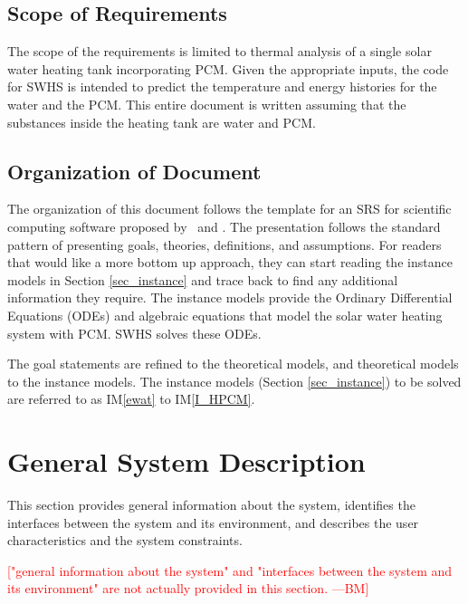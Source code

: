 \documentclass[12pt]{article}
\newcommand{\authornote}[3]{\textcolor{#1}{[#3 ---#2]}}
\newcommand{\authornote}[3]{}
\newcommand{\bmac}[1]{\authornote{red}{BM}{#1}}
\newcommand{\iref}[1]{IM\ref{#1}}
\newcommand{\progname}{SWHS}
\begin{document}
\subsection{Scope of Requirements} 

The scope of the requirements is limited to thermal analysis of a single solar
water heating tank incorporating PCM.  Given the appropriate inputs, the code
for \progname{} is intended to predict the temperature and energy histories for
the water and the PCM.  This entire document is written assuming that the
substances inside the heating tank are water and PCM.

\subsection{Organization of Document}

The organization of this document follows the template for an SRS for scientific
computing software proposed by~\cite{Koothoor2013} and \cite{SmithAndLai2005}.
The presentation follows the standard pattern of presenting goals, theories,
definitions, and assumptions.  For readers that would like a more bottom up
approach, they can start reading the instance models in Section
\ref{sec_instance} and trace back to find any additional information they
require.  The instance models provide the Ordinary Differential Equations (ODEs)
and algebraic equations that model the solar water heating system with PCM.
\progname{} solves these ODEs.

The goal statements are refined to the theoretical models, and theoretical
models to the instance models.  The instance models (Section \ref{sec_instance})
to be solved are referred to as \iref{ewat} to \iref{I_HPCM}.


\section{General System Description}

This section provides general information about the system,
identifies the interfaces between the system and its environment, and describes the
user characteristics and the system constraints.

\bmac{"general information about the system" and "interfaces between the system and its environment" are not actually provided in this section.}
\end{document}
